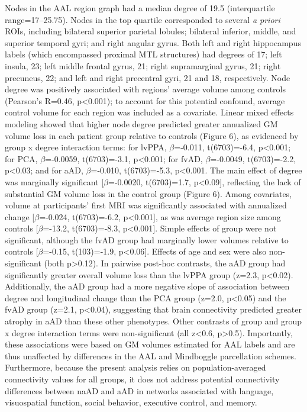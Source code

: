 \documentclass[]{article}
\begin{document}
Nodes in the AAL region graph had a median degree of 19.5 (interquartile
range=17--25.75). Nodes in the top quartile corresponded to several
\emph{a priori} ROIs, including bilateral superior parietal lobules;
bilateral inferior, middle, and superior temporal gyri; and right
angular gyrus. Both left and right hippocampus labels (which encompassed
proximal MTL structures) had degrees of 17; left insula, 23; left middle
frontal gyrus, 21; right supramarginal gyrus, 21; right precuneus, 22;
and left and right precentral gyri, 21 and 18, respectively. Node degree
was positively associated with regions' average volume among controls
(Pearson's R=0.46, p\textless{}0.001); to account for this potential
confound, average control volume for each region was included as a
covariate. Linear mixed effects modeling showed that higher node degree
predicted greater annualized GM volume loss in each patient group
relative to controls (Figure 6), as evidenced by group x degree
interaction terms: for lvPPA, \(\beta\)=-0.011, t(6703)=-6.4,
p\textless{}0.001; for PCA, \(\beta\)=-0.0059, t(6703)=-3.1,
p\textless{}0.001; for fvAD, \(\beta\)=-0.0049, t(6703)=-2.2,
p\textless{}0.03; and for aAD, \(\beta\)=-0.010, t(6703)=-5.3,
p\textless{}0.001. The main effect of degree was marginally significant
{[}\(\beta\)=-0.0020, t(6703)=1.7, p\textless{}0.09{]}, reflecting the
lack of substantial GM volume loss in the control group (Figure 6).
Among covariates, volume at participants' first MRI was significantly
associated with annualized change {[}\(\beta\)=-0.024, t(6703)=-6.2,
p\textless{}0.001{]}, as was average region size among controls
{[}\(\beta\)=-13.2, t(6703)=-8.3, p\textless{}0.001{]}. Simple effects
of group were not significant, although the fvAD group had marginally
lower volumes relative to controls {[}\(\beta\)=-0.15, t(103)=-1.9,
p\textless{}0.06{]}. Effects of age and sex were also non-significant
(both p\textgreater{}0.12). In pairwise post-hoc contrasts, the aAD
group had significantly greater overall volume loss than the lvPPA group
(z=2.3, p\textless{}0.02). Additionally, the aAD group had a more
negative slope of association between degree and longitudinal change
than the PCA group (z=2.0, p\textless{}0.05) and the fvAD group (z=2.1,
p\textless{}0.04), suggesting that brain connectivity predicted greater
atrophy in aAD than these other phenotypes. Other contrasts of group and
group x degree interaction terms were non-significant (all
z\textless{}0.6, p\textgreater{}0.5). Importantly, these associations
were based on GM volumes estimated for AAL labels and are thus
unaffected by differences in the AAL and Mindboggle parcellation
schemes. Furthermore, because the present analysis relies on
population-averaged connectivity values for all groups, it does not
address potential connectivity differences between naAD and aAD in
networks associated with language, visuospatial function, social
behavior, executive control, and memory.
\end{document}
